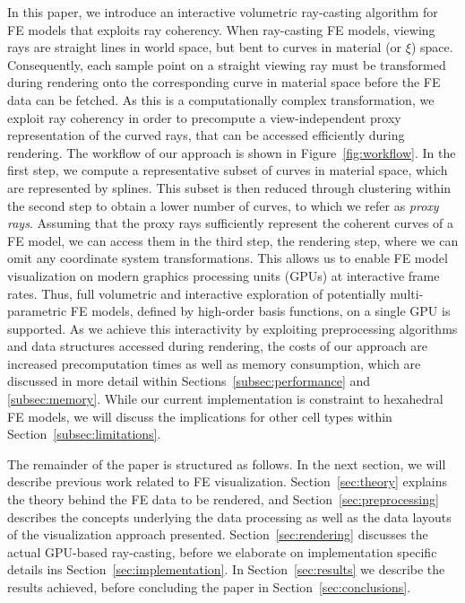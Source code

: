 \documentclass[journal]{vgtc}                %
\begin{document}
In this paper, we introduce an interactive volumetric ray-casting algorithm for FE models that exploits ray coherency. When ray-casting FE models, viewing rays are straight lines in world space, but bent to curves in material (or $\xi$) space. Consequently, each sample point on a straight viewing ray must be transformed during rendering onto the corresponding curve in material space before the FE data can be fetched. As this is a computationally complex transformation, we exploit ray coherency in order to precompute a view-independent proxy representation of the curved rays, that can be accessed efficiently during rendering. The workflow of our approach is shown in Figure~\ref{fig:workflow}. In the first step, we compute a representative subset of curves in material space, which are represented by splines. This subset is then reduced through clustering within the second step to obtain a lower number of curves, to which we refer as \emph{proxy rays}. Assuming that the proxy rays sufficiently represent the coherent curves of a FE model, we can access them in the third step, the rendering step, where we can omit any coordinate system transformations. This allows us to enable FE model visualization on modern graphics processing units (GPUs) at interactive frame rates. Thus, full volumetric and interactive exploration of potentially multi-parametric FE models, defined by high-order basis functions, on a single GPU is supported. As we achieve this interactivity by exploiting preprocessing algorithms and data structures accessed during rendering, the costs of our approach are increased precomputation times as well as memory consumption, which are discussed in more detail within Sections~\ref{subsec:performance} and \ref{subsec:memory}. While our current implementation is constraint to hexahedral FE models, we will discuss the implications for other cell types within Section~\ref{subsec:limitations}.

The remainder of the paper is structured as follows. In the next section, we will describe previous work related to FE visualization. Section~\ref{sec:theory} explains the theory behind the FE data to be rendered, and Section~\ref{sec:preprocessing} describes the concepts underlying the data processing as well as the data layouts of the visualization approach presented. Section~\ref{sec:rendering} discusses the actual GPU-based ray-casting, before we elaborate on implementation specific details ins Section~\ref{sec:implementation}. In Section~\ref{sec:results} we describe the results achieved, before concluding the paper in Section~\ref{sec:conclusions}.
%
%
%
\end{document}

